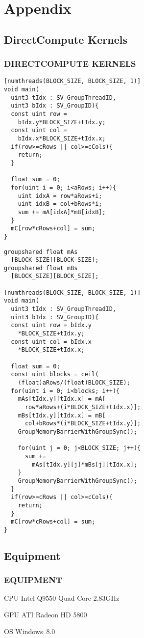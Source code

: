 \section{Appendix}

\subsection{DirectCompute Kernels}
\begin{frame}[fragile]
\frametitle{DIRECTCOMPUTE KERNELS}

\begin{multicols}{2}
\begin{lstlisting}
[numthreads(BLOCK_SIZE, BLOCK_SIZE, 1)]
void main(
  uint3 tIdx : SV_GroupThreadID,
  uint3 bIdx : SV_GroupID){
  const uint row =
    bIdx.y*BLOCK_SIZE+tIdx.y;
  const uint col =
    bIdx.x*BLOCK_SIZE+tIdx.x;
  if(row>=cRows || col>=cCols){
    return;
  }

  float sum = 0;
  for(uint i = 0; i<aRows; i++){
    uint idxA = row*aRows+i;
    uint idxB = col+bRows*i;
    sum += mA[idxA]*mB[idxB];
  }
  mC[row*cRows+col] = sum;
}
\end{lstlisting}
\begin{lstlisting}
groupshared float mAs
  [BLOCK_SIZE][BLOCK_SIZE];
groupshared float mBs
  [BLOCK_SIZE][BLOCK_SIZE];

[numthreads(BLOCK_SIZE, BLOCK_SIZE, 1)]
void main(
  uint3 tIdx : SV_GroupThreadID,
  uint3 bIdx : SV_GroupID){
  const uint row = bIdx.y
    *BLOCK_SIZE+tIdx.y;
  const uint col = bIdx.x
    *BLOCK_SIZE+tIdx.x;
  
  float sum = 0;
  const uint blocks = ceil( 
    (float)aRows/(float)BLOCK_SIZE);
  for(uint i = 0; i<blocks; i++){
    mAs[tIdx.y][tIdx.x] = mA[ 
      row*aRows+(i*BLOCK_SIZE+tIdx.x)];
    mBs[tIdx.y][tIdx.x] = mB[ 
      col+bRows*(i*BLOCK_SIZE+tIdx.y)];
    GroupMemoryBarrierWithGroupSync();

    for(uint j = 0; j<BLOCK_SIZE; j++){
      sum += 
        mAs[tIdx.y][j]*mBs[j][tIdx.x];
    }
    GroupMemoryBarrierWithGroupSync();
  }
  if(row>=cRows || col>=cCols){
    return;
  }
  mC[row*cRows+col] = sum;
}
\end{lstlisting}
\end{multicols}

\end{frame}

\subsection{Equipment}
\begin{frame}
\frametitle{EQUIPMENT}

\begin{block}{CPU}
Intel Q9550 Quad Core $2.83$GHz
\end{block}

\begin{block}{GPU}
ATI Radeon HD 5800
\end{block}

\begin{block}{OS}
Windows~8.0
\end{block}

\end{frame}

